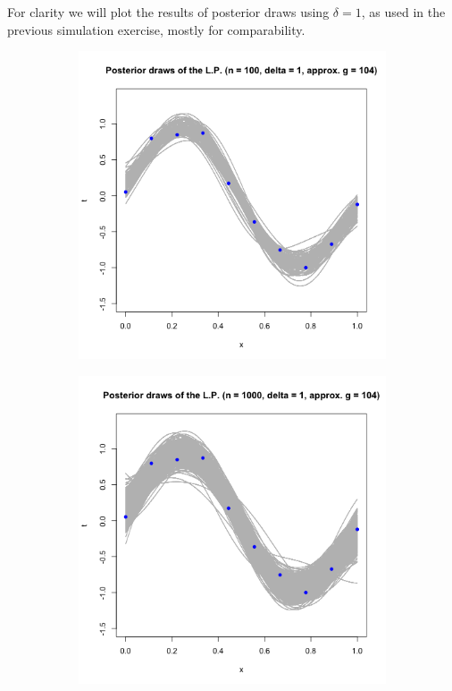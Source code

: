 \documentclass[a4paper, 11pt]{article}
\begin{document}
For clarity we will plot the results of posterior draws using $\delta=1$, as used in the previous simulation exercise, mostly for comparability.\\
\begin{figure}[h]
\centering
\begin{subfigure}{.5\textwidth}
  \centering
  \includegraphics[width=1\linewidth]{ps3F_plot2_0.png}
\end{subfigure}%
\begin{subfigure}{.5\textwidth}
  \centering
  \includegraphics[width=1\linewidth]{ps3F_plot2.png}
\end{subfigure}
\end{figure}
\end{document}
